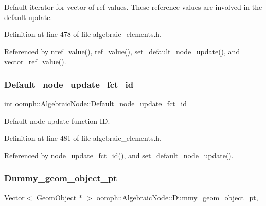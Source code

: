 Default iterator for vector of ref values. These reference values are involved in the default update. 

Definition at line 478 of file algebraic\+\_\+elements.\+h.



Referenced by nref\+\_\+value(), ref\+\_\+value(), set\+\_\+default\+\_\+node\+\_\+update(), and vector\+\_\+ref\+\_\+value().

\mbox{\label{classoomph_1_1AlgebraicNode_adba92e804261f449a9142920661c339a}} 
\subsubsection{\texorpdfstring{Default\+\_\+node\+\_\+update\+\_\+fct\+\_\+id}{Default\_node\_update\_fct\_id}}
{\footnotesize\ttfamily int oomph\+::\+Algebraic\+Node\+::\+Default\+\_\+node\+\_\+update\+\_\+fct\+\_\+id\hspace{0.3cm}{\ttfamily [private]}}



Default node update function ID. 



Definition at line 481 of file algebraic\+\_\+elements.\+h.



Referenced by node\+\_\+update\+\_\+fct\+\_\+id(), and set\+\_\+default\+\_\+node\+\_\+update().

\mbox{\label{classoomph_1_1AlgebraicNode_a74bfe556a50b852ee06245e6a374d5fc}} 
\subsubsection{\texorpdfstring{Dummy\+\_\+geom\+\_\+object\+\_\+pt}{Dummy\_geom\_object\_pt}}
{\footnotesize\ttfamily \hyperlink{classoomph_1_1Vector}{Vector}$<$ \hyperlink{classoomph_1_1GeomObject}{Geom\+Object} $\ast$ $>$ oomph\+::\+Algebraic\+Node\+::\+Dummy\+\_\+geom\+\_\+object\+\_\+pt\hspace{0.3cm}{\ttfamily [static]}, {\ttfamily [private]}}



